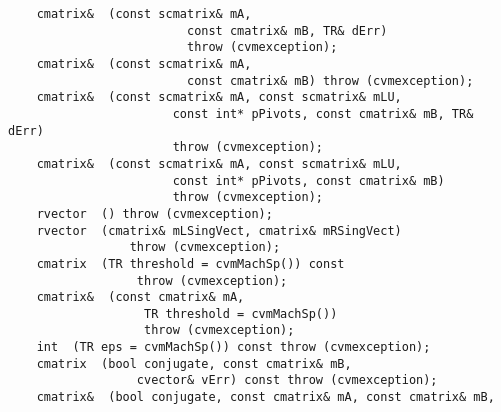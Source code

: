 \verb"    cmatrix& "\verb" (const scmatrix& mA,"\\
\verb"                         const cmatrix& mB, TR& dErr)"\\
\verb"                         throw (cvmexception);"\\
\verb"    cmatrix& "\verb" (const scmatrix& mA,"\\
\verb"                         const cmatrix& mB) throw (cvmexception);"\\
\verb"    cmatrix& "\verb" (const scmatrix& mA, const scmatrix& mLU,"\\
\verb"                       const int* pPivots, const cmatrix& mB, TR& dErr)"\\
\verb"                       throw (cvmexception);"\\
\verb"    cmatrix& "\verb" (const scmatrix& mA, const scmatrix& mLU,"\\
\verb"                       const int* pPivots, const cmatrix& mB)"\\
\verb"                       throw (cvmexception);"\\
\verb"    rvector "\verb" () throw (cvmexception);"\\
\verb"    rvector "\verb" (cmatrix& mLSingVect, cmatrix& mRSingVect)"\\
\verb"                 throw (cvmexception);"\\
\verb"    cmatrix "\verb" (TR threshold = cvmMachSp()) const"\\
\verb"                  throw (cvmexception);"\\
\verb"    cmatrix& "\verb" (const cmatrix& mA,"\\
\verb"                   TR threshold = cvmMachSp())"\\
\verb"                   throw (cvmexception);"\\
\verb"    int "\verb" (TR eps = cvmMachSp()) const throw (cvmexception);"\\
\verb"    cmatrix "\verb" (bool conjugate, const cmatrix& mB,"\\
\verb"                  cvector& vErr) const throw (cvmexception);"\\
\verb"    cmatrix& "\verb" (bool conjugate, const cmatrix& mA, const cmatrix& mB,"\\

